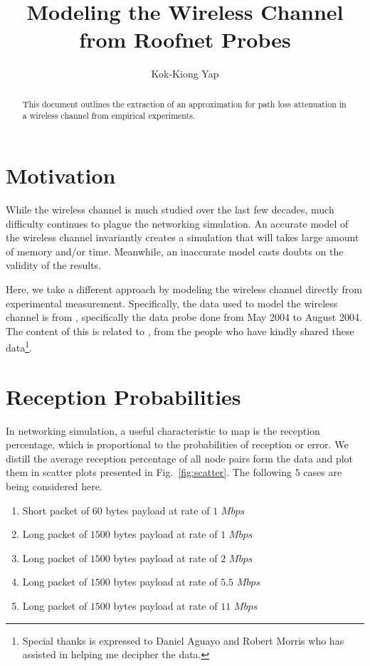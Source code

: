 \documentclass[11pt,twocolumn]{article}
\title{Modeling the Wireless Channel from Roofnet Probes}
\author{Kok-Kiong Yap}
\begin{document}
\maketitle

\begin{abstract}
This document outlines the extraction of an approximation for path loss attenuation in a wireless channel from empirical experiments.
\end{abstract}

\section{Motivation}
While the wireless channel is much studied over the last few decades, much difficulty continues to plague the networking simulation.  An accurate model of the wireless channel invariantly creates a simulation that will takes large amount of memory and/or time.  Meanwhile, an inaccurate model casts doubts on the validity of the results.

Here, we take a different approach by modeling the wireless channel directly from experimental measurement.  Specifically, the data used to model the wireless channel is from \cite{roofnetdata}, specifically the data probe done from May 2004 to August 2004.  The content of this is related to \cite{Aguayo:2004lr}, from the people who have kindly shared these data\footnote{Special thanks is expressed to Daniel Aguayo and Robert Morris who has assisted in helping me decipher the data.}.

\section{Reception Probabilities}
In networking simulation, a useful characteristic to map is the reception percentage, which is proportional to the probabilities of reception or error.  We distill the average reception percentage of all node pairs form the data and plot them in scatter plots presented in Fig.~\ref{fig:scatter}.  The following $5$ cases are being considered here.
\begin{enumerate}
\item Short packet of $60$ bytes payload at rate of $1$ $Mbps$
\item Long packet of $1500$ bytes payload at rate of $1$ $Mbps$
\item Long packet of $1500$ bytes payload at rate of $2$ $Mbps$
\item Long packet of $1500$ bytes payload at rate of $5.5$ $Mbps$
\item Long packet of $1500$ bytes payload at rate of $11$ $Mbps$
\end{enumerate}
\end{document}
